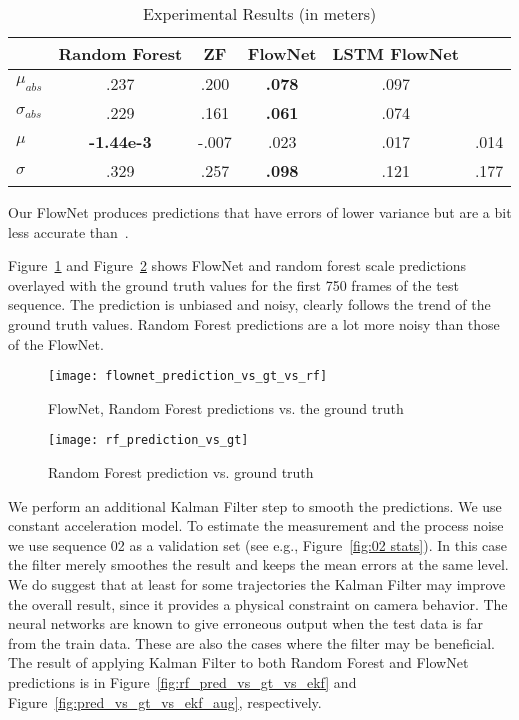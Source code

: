 \begin{table}[ht]
  \centering
  \begin{tabular}{ lccccc }
    \hline
                       & Random Forest     & ZF    & FlowNet          & LSTM FlowNet & \cite{frost2016}   \\
    \hline
    $\mu_{abs}$        & .237              & .200  & \textbf{.078}    & .097         & \\
    $\sigma_{abs}$     & .229              & .161  & \textbf{.061}    & .074         & \\
    $\mu$              & \textbf{-1.44e-3} & -.007 & .023             & .017         & .014\\
    $\sigma$           & .329              & .257  & \textbf{.098}    & .121         & .177\\
    \hline
  \end{tabular}
  \caption{Experimental Results (in meters)}
  \label{table:main result}
\end{table}

Our FlowNet produces predictions that have errors of lower variance
but are a bit less accurate than~\cite{frost2017using}.

Figure~\ref{fig:pred_vs_gt} and Figure~\ref{fig:rf_pred_vs_gt} shows
FlowNet and random forest scale predictions overlayed with the ground
truth values for the first 750 frames of the test sequence.  The
prediction is unbiased and noisy, clearly follows the trend of the
ground truth values.  Random Forest predictions are a lot more noisy
than those of the FlowNet.

\begin{figure}[!ht]
  \centering
  \texttt{[image: flownet\_prediction\_vs\_gt\_vs\_rf]}
  \caption{FlowNet, Random Forest predictions vs. the ground truth}
  \label{fig:pred_vs_gt}
\end{figure}

\begin{figure}[!ht]
  \centering
  \texttt{[image: rf\_prediction\_vs\_gt]}
  \caption{Random Forest prediction vs. ground truth}
  \label{fig:rf_pred_vs_gt}
\end{figure}

We perform an additional Kalman Filter step to smooth the predictions.
We use constant acceleration model.  To estimate the measurement and
the process noise we use sequence 02 as a validation set (see e.g.,
Figure~\ref{fig:02 stats}).  In this case the filter merely smoothes
the result and keeps the mean errors at the same level.  We do suggest
that at least for some trajectories the Kalman Filter may improve the
overall result, since it provides a physical constraint on camera
behavior.  The neural networks are known to give erroneous output when
the test data is far from the train data.  These are also the cases
where the filter may be beneficial.  The result of applying Kalman
Filter to both Random Forest and FlowNet predictions is in
Figure~\ref{fig:rf_pred_vs_gt_vs_ekf} and
Figure~\ref{fig:pred_vs_gt_vs_ekf_aug}, respectively.

